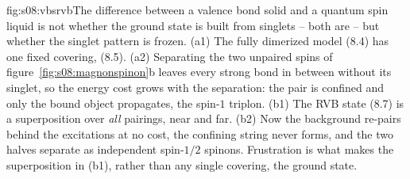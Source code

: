 %
\begin{aqmfigure}{fig:s08:vbsrvb}{The difference between a valence bond solid and a quantum spin
liquid is not whether the ground state is built from singlets -- both are -- but whether the
singlet pattern is frozen. (a1) The fully dimerized model (8.4) has one fixed covering, (8.5).
(a2) Separating the two unpaired spins of figure~\ref{fig:s08:magnonspinon}b leaves every strong
bond in between without its singlet, so the energy cost grows with the separation: the pair is
confined and only the bound object propagates, the spin-$1$ triplon. (b1) The RVB state (8.7) is a
superposition over \emph{all} pairings, near and far. (b2) Now the background re-pairs behind the
excitations at no cost, the confining string never forms, and the two halves separate as
independent spin-$1/2$ spinons. Frustration is what makes the superposition in (b1), rather than
any single covering, the ground state.}

\end{aqmfigure}
